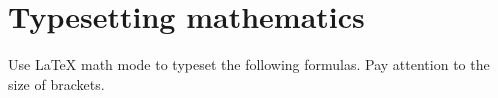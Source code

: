 \section{Typesetting mathematics}

Use \LaTeX{} math mode to typeset the following formulas.
Pay attention to the size of brackets.


\vspace{1cm}